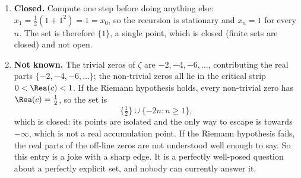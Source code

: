 \begin{exercisesolution}
\begin{enumerate}[label=\textbf{(\alph*)}]
    The lesson is that the union in \textbf{(d)} was closed-looking but glued into a half-open
    interval, whereas the union in \textbf{(e)} punctures itself at every join. Being a union
    of closed sets buys nothing; being a union of open sets buys everything.
  \item \textbf{Closed.} Compute one step before doing anything else:
    $x_1 = \tfrac12(1 + 1^2) = 1 = x_0$, so the recursion is stationary and $x_n = 1$ for every
    $n$. The set is therefore $\{1\}$, a single point, which is closed (finite sets are closed)
    and not open.
  \item \textbf{Not known.} The trivial zeros of $\zeta$ are $-2,-4,-6,\dots$, contributing
    the real parts $\{-2,-4,-6,\dots\}$; the non-trivial zeros all lie in the critical strip
    $0 < \Rea(c) < 1$. If the Riemann hypothesis holds, every non-trivial zero has
    $\Rea(c) = \tfrac12$, so the set is
    \[\{\tfrac12\} \cup \{-2n : n \geq 1\},\]
    which is closed: its points are isolated and the only way to escape is towards $-\infty$,
    which is not a real accumulation point. If the Riemann hypothesis fails, the real parts of
    the off-line zeros are not understood well enough to say. So this entry is a joke with a
    sharp edge. It is a perfectly well-posed question about a perfectly explicit set, and nobody
    can currently answer it.
\end{enumerate}
\end{exercisesolution}
